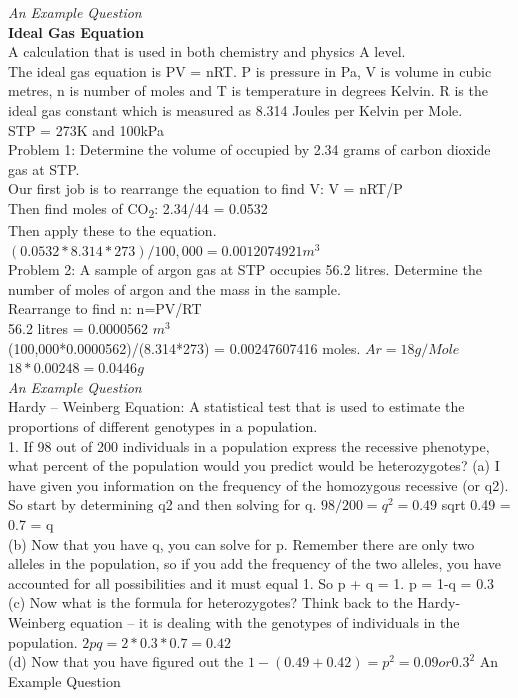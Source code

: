 \documentclass[a4paper,12pt]{book}
\begin{document}
\begin{flushleft}
         \emph{ An Example Question}\\
\textbf{Ideal Gas Equation}\\  A calculation that is used in both chemistry and physics A level.\\
The ideal gas equation is PV = nRT. P is pressure in Pa, V is volume in cubic metres, n is number of moles and T is temperature in degrees Kelvin. R is the ideal gas constant which is measured as 8.314 Joules per Kelvin per Mole.\\
STP = 273K and 100kPa\\
Problem 1: Determine the volume of occupied by 2.34 grams of carbon dioxide gas at STP.\\
Our first job is to rearrange the equation to find V: V = nRT/P\\
Then find moles of CO\textsubscript{2}: 2.34/44 =  0.0532\\
Then apply these to the equation.\\
$ (0.0532*8.314*273)/100,000 = 0.0012074921  m^3 $\\
Problem 2: A sample of argon gas at STP occupies 56.2 litres. Determine the number of moles of argon and the mass in the sample.\\
Rearrange to find n: n=PV/RT\\
56.2  litres = 0.0000562 $ m^3 $\\
(100,000*0.0000562)/(8.314*273) = 0.00247607416 moles. $ Ar = 18g/Mole $\\
$ 18*0.00248 = 0.0446g $\\
\emph{An Example Question}\\
Hardy – Weinberg Equation: A statistical test that is used to estimate the proportions of different genotypes in a population.\\
1. If 98 out of 200 individuals in a population express the recessive phenotype, what percent of the population would you predict would be heterozygotes?
(a) I have given you information on the frequency of the homozygous recessive (or q2). So start by determining q2 and then solving for q.  $ 98/200 =  q^2 = 0.49 $
sqrt 0.49 = 0.7 = q\\
(b) Now that you have q, you can solve for p. Remember there are only two alleles in the population, so if you add the frequency of the two alleles, you have accounted for all possibilities and it must equal 1. So p + q = 1. p = 1-q = 0.3\\
(c) Now what is the formula for heterozygotes? Think back to the Hardy-Weinberg equation -- it is dealing with the genotypes of individuals in the population.
$ 2pq = 2*0.3*0.7 = 0.42 $\\
(d) Now that you have figured out the %
$ 1-(0.49 + 0.42) = p^2 = 0.09 or 0.3^2 $
An Example Question
\end{flushleft}
\end{document}
